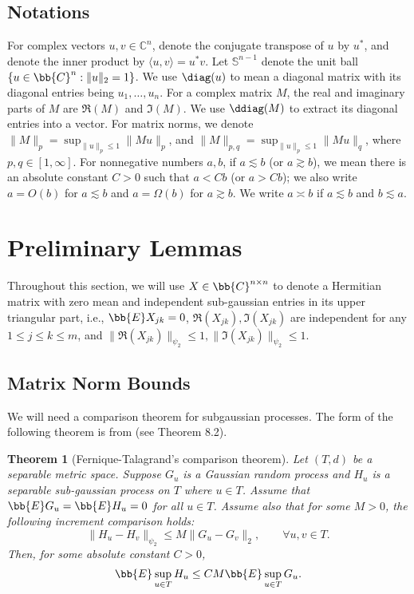 \documentclass[12pt]{article}%
\theoremstyle{plain}%
\newtheorem{thm}{Theorem}[section]
\theoremstyle{remark}
\begin{document}
\subsection{Notations}\label{sec::notation}
For complex vectors $u,v \in \mathbb{C}^n$, denote the conjugate transpose of $u$ by $u^*$, and denote the inner product by $\langle u, v \rangle = u^* v$. Let $\mathbb{S}^{n-1}$ denote the unit ball $\{u \in \bb{C}^n: \| u \|_2 = 1\}$. We use $\diag(u)$ to mean a diagonal matrix with its diagonal entries being $u_1,\ldots,u_n$. For a complex matrix $M$, the real and imaginary parts of $M$ are $\Re(M)$ and $\Im(M)$. We use $\ddiag(M)$ to extract its diagonal entries into a vector. For matrix norms, we denote $\| M \|_p = \sup_{ \| u \|_p \le 1 } \| M u \|_p$, and $\| M \|_{p,q} = \sup_{ \| u \|_p \le 1 } \| M u \|_q$, where $p,q \in [1, \infty]$. For nonnegative numbers $a,b$, if $a \lesssim b$ (or $a \gtrsim b$), we mean there is an absolute constant $C>0$ such that $a < Cb$ (or $a > Cb$); we also write $a = O( b )$ for $a \lesssim b$ and $a = \Omega(b)$ for $a \gtrsim b$. We write $a \asymp b$ if $a \lesssim b$ and $b \lesssim a$.

\section{Preliminary Lemmas}\label{sec::pre}
Throughout this section, we will use $X \in \bb{C}^{n \times n}$ to denote a Hermitian matrix with zero mean and independent sub-gaussian entries in its upper triangular part, i.e., $\bb{E} X_{jk} = 0$, $\Re(X_{jk}), \Im(X_{jk})$ are independent for any $1 \le j \le k \le m$, and $\| \Re(X_{jk}) \|_{\psi_2} \le 1, \| \Im(X_{jk}) \|_{\psi_2} \le 1$. 

\subsection{Matrix Norm Bounds}

We will need a comparison theorem for subgaussian processes. The form of the following theorem is from \cite{Ver15} (see Theorem 8.2).

\begin{thm}[Fernique-Talagrand's comparison theorem]\label{thm::subgCmp}
Let $(T, d)$ be a separable metric space. Suppose $G_u$ is a Gaussian random process and $H_u$ is a separable sub-gaussian process on $T$ where $u \in T$. Assume that $\bb{E} G_u = \bb{E} H_u = 0$ for all $u \in T$. Assume also that for some $M > 0$, the following increment comparison holds:
\begin{equation}\label{ineqn::increment}
\| H_u - H_v \|_{\psi_2} \le M \| G_u - G_v \|_2, \qquad \forall u,v \in T.
\end{equation}
Then, for some absolute constant $C>0$,
\begin{equation*}
\bb{E} \sup_{u \in T} H_u \le CM \bb{E} \sup_{u \in T} G_u.
\end{equation*}
\end{thm}
\end{document}
